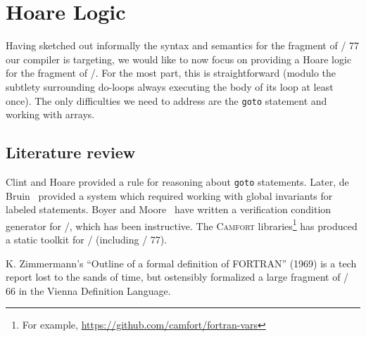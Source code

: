 \section{Hoare Logic}
Having sketched out informally the syntax and semantics for the fragment
of \FORTRAN/ 77 our compiler is targeting, we would like to now focus on
providing a Hoare logic for the fragment of \FORTRAN/. For the most
part, this is straightforward (modulo the subtlety surrounding do-loops
always executing the body of its loop at least once). The only
difficulties we need to address are the \texttt{goto} statement and
working with arrays.

\subsection{Literature review}
Clint and Hoare provided a rule for reasoning about \texttt{goto}
statements. Later, de Bruin~\cite{deBruin1981goto} provided a system
which required working with global invariants for labeled statements.
Boyer and Moore~\cite{boyer1980vcg} have written a verification
condition generator for \FORTRAN/, which has been instructive.
The \textsc{Camfort} libraries\footnote{For example, \url{https://github.com/camfort/fortran-vars}} has produced a static toolkit for \FORTRAN/
(including \FORTRAN/ 77).

K. Zimmermann's ``Outline of a formal deﬁnition of FORTRAN'' (1969) is a
tech report lost to the sands of time, but ostensibly formalized a large
fragment of \FORTRAN/ 66 in the Vienna Definition Language.



